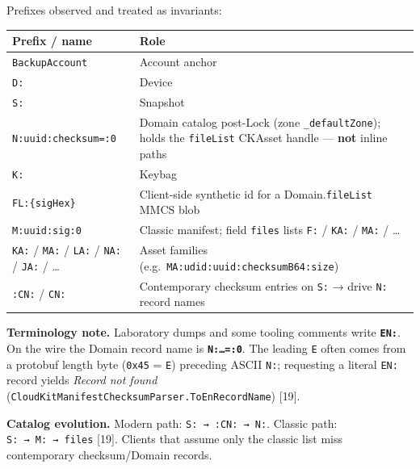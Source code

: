 \documentclass[
  english,
  10pt]{article}
\newcounter{none} %
\begin{document}
Prefixes observed and treated as invariants:

{\def\LTcaptype{none} %
\begin{longtable}[]{@{}
  >{\raggedright\arraybackslash}p{}
  >{\raggedright\arraybackslash}p{}@{}}
\toprule\noalign{}
\begin{minipage}[b]{\linewidth}\raggedright
Prefix / name
\end{minipage} & \begin{minipage}[b]{\linewidth}\raggedright
Role
\end{minipage} \\
\midrule\noalign{}
\endhead
\bottomrule\noalign{}
\endlastfoot
\texttt{BackupAccount} & Account anchor \\
\texttt{D:} & Device \\
\texttt{S:} & Snapshot \\
\texttt{N:uuid:checksum=:0} & Domain catalog post-Lock (zone
\texttt{\_defaultZone}); holds the \texttt{fileList} CKAsset handle ---
\textbf{not} inline paths \\
\texttt{K:} & Keybag \\
\texttt{FL:\{sigHex\}} & Client-side synthetic id for a
Domain.\texttt{fileList} MMCS blob \\
\texttt{M:uuid:sig:0} & Classic manifest; field \texttt{files} lists
\texttt{F:} / \texttt{KA:} / \texttt{MA:} / \ldots{} \\
\texttt{KA:} / \texttt{MA:} / \texttt{LA:} / \texttt{NA:} / \texttt{JA:}
/ \ldots{} & Asset families
(e.g.~\texttt{MA:udid:uuid:checksumB64:size}) \\
\texttt{:CN:} / \texttt{CN:} & Contemporary checksum entries on
\texttt{S:} → drive \texttt{N:} record names \\
\end{longtable}
}

\textbf{Terminology note.} Laboratory dumps and some tooling comments
write \textbf{\texttt{EN:}}. On the wire the Domain record name is
\textbf{\texttt{N:…=:0}}. The leading \texttt{E} often comes from a
protobuf length byte (\texttt{0x45} =
\texttt{\textquotesingle{}E\textquotesingle{}}) preceding ASCII
\texttt{N:}; requesting a literal \texttt{EN:} record yields
\emph{Record not found}
(\texttt{CloudKitManifestChecksumParser.ToEnRecordName}) {[}19{]}.

\textbf{Catalog evolution.} Modern path: \texttt{S:\ →\ :CN:\ →\ N:}.
Classic path: \texttt{S:\ →\ M:\ →\ files} {[}19{]}. Clients that assume
only the classic list miss contemporary checksum/Domain records.
\end{document}
